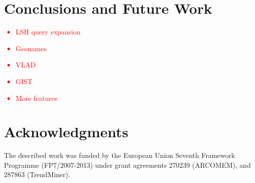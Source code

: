 \documentclass{../acm_proc_article-me11_tweaked}
\begin{document}
\section{Conclusions and Future Work}
\textcolor{red}{\begin{itemize}
    \item LSH query expansion
    \item Geonames
    \item VLAD
    \item GIST
    \item More features
\end{itemize}}

\section{Acknowledgments}
The described work was funded by the European Union Seventh Framework Programme (FP7/2007-2013) under grant agreements 270239 (ARCOMEM), and 287863 (TrendMiner).




\end{document}
